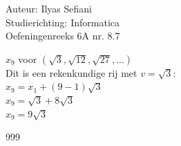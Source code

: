 \documentclass[a4paper]{article}
\begin{document}
\noindent \large Auteur: Ilyas Sefiani \\
\noindent \large Studierichting: Informatica\\
\noindent \large Oefeningenreeks 6A nr. 8.7\\

\medskip

\normalsize

$x_{9}$ voor $(\sqrt{3},\sqrt{12},\sqrt{27},...)$\\

Dit is een rekenkundige rij met $v=\sqrt{3}$:\\

$x_{9}= x_1 + (9-1)\sqrt{3}$\\

$x_{9}=\sqrt{3} + 8\sqrt{3}$\\

$x_{9}= 9\sqrt{3}$\\

\begin{thebibliography}{999}
\end{thebibliography}
\end{document}
